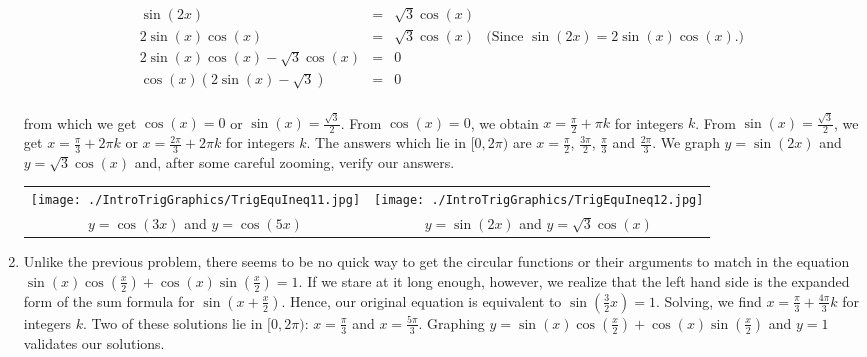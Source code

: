 \begin{ex}
\begin{enumerate}
\[ \begin{array}{rclr}

\sin(2x) & = & \sqrt{3} \cos(x) & \\
2 \sin(x) \cos(x) & = & \sqrt{3} \cos(x)  & \text{(Since $\sin(2x) = 2\sin(x) \cos(x)$.)} \\
2\sin(x) \cos(x) - \sqrt{3} \cos(x) & = & 0 & \\
\cos(x) (2 \sin(x) - \sqrt{3}) & = & 0 & \\ \end{array} \]

from which we get $\cos(x) = 0$ or $\sin(x) = \frac{\sqrt{3}}{2}$. From $\cos(x) = 0$, we obtain $x = \frac{\pi}{2} + \pi k$ for integers $k$. From $\sin(x) = \frac{\sqrt{3}}{2}$, we get $x = \frac{\pi}{3} + 2\pi k$ or $x = \frac{2\pi}{3} + 2\pi k$ for integers $k$.  The answers which lie in $[0,2\pi)$ are $x = \frac{\pi}{2}$, $\frac{3\pi}{2}$, $\frac{\pi}{3}$ and $\frac{2\pi}{3}$.  We graph $y = \sin(2x)$ and $y = \sqrt{3} \cos(x)$ and, after some careful zooming,  verify our answers.

\begin{center}

\begin{tabular}{cc}

\texttt{[image: ./IntroTrigGraphics/TrigEquIneq11.jpg]} &

\hspace{0.75in} \texttt{[image: ./IntroTrigGraphics/TrigEquIneq12.jpg]} \\

$y = \cos(3x)$ and \boldmath $y = \cos(5x)$    & 

 \hspace{0.75in} $y = \sin(2x)$ and \boldmath $y = \sqrt{3} \cos(x)$  \\
 
 \end{tabular}

\end{center}

\item Unlike the previous problem, there seems to be no quick way to get the circular functions or their arguments to match in the equation $\sin(x)\cos\left(\frac{x}{2}\right) + \cos(x)\sin\left(\frac{x}{2}\right) = 1$.  If we stare at it long enough, however,  we realize that the left hand side is the expanded form of the sum formula for $\sin\left(x + \frac{x}{2}\right)$.  Hence, our original equation is equivalent to  $\sin\left(\frac{3}{2} x\right) = 1$.  Solving, we find $x = \frac{\pi}{3} + \frac{4\pi}{3} k$ for integers $k$.  Two of these solutions lie in $[0,2\pi)$: $x = \frac{\pi}{3}$ and $x = \frac{5\pi}{3}$. Graphing $y = \sin(x)\cos\left(\frac{x}{2}\right) + \cos(x)\sin\left(\frac{x}{2}\right)$ and $y = 1$ validates our solutions.


\end{enumerate}
\end{ex}
